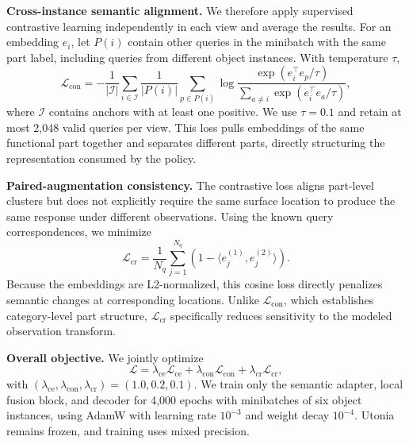 \textbf{Cross-instance semantic alignment.}
We therefore apply supervised contrastive learning independently in each view and average the results. For an embedding $e_i$, let $P(i)$ contain other queries in the minibatch with the same part label, including queries from different object instances. With temperature $\tau$,
\begin{equation}
\mathcal{L}_{\mathrm{con}}
=-\frac{1}{|\mathcal{I}|}\sum_{i\in\mathcal{I}}\frac{1}{|P(i)|}
\sum_{p\in P(i)}\log
\frac{\exp(e_i^\top e_p/\tau)}{\sum_{a\ne i}\exp(e_i^\top e_a/\tau)},
\label{eq:align_loss}
\end{equation}
where $\mathcal{I}$ contains anchors with at least one positive. We use $\tau=0.1$ and retain at most 2,048 valid queries per view. This loss pulls embeddings of the same functional part together and separates different parts, directly structuring the representation consumed by the policy.

\textbf{Paired-augmentation consistency.}
The contrastive loss aligns part-level clusters but does not explicitly require the same surface location to produce the same response under different observations. Using the known query correspondences, we minimize
\begin{equation}
    \mathcal{L}_{\mathrm{cr}}
    =\frac{1}{N_q}\sum_{j=1}^{N_q}
    \left(1-\langle e_j^{(1)},e_j^{(2)}\rangle\right).
    \label{eq:stability_loss}
\end{equation}
Because the embeddings are L2-normalized, this cosine loss directly penalizes semantic changes at corresponding locations. Unlike $\mathcal{L}_{\mathrm{con}}$, which establishes category-level part structure, $\mathcal{L}_{\mathrm{cr}}$ specifically reduces sensitivity to the modeled observation transform.

\textbf{Overall objective.}
We jointly optimize
\begin{equation}
    \mathcal{L}=\lambda_{\mathrm{ce}}\mathcal{L}_{\mathrm{ce}}
    +\lambda_{\mathrm{con}}\mathcal{L}_{\mathrm{con}}
    +\lambda_{\mathrm{cr}}\mathcal{L}_{\mathrm{cr}},
    \label{eq:total_loss}
\end{equation}
with $(\lambda_{\mathrm{ce}},\lambda_{\mathrm{con}},\lambda_{\mathrm{cr}})=(1.0,0.2,0.1)$. We train only the semantic adapter, local fusion block, and decoder for 4,000 epochs with minibatches of six object instances, using AdamW with learning rate $10^{-3}$ and weight decay $10^{-4}$. Utonia remains frozen, and training uses mixed precision. 



